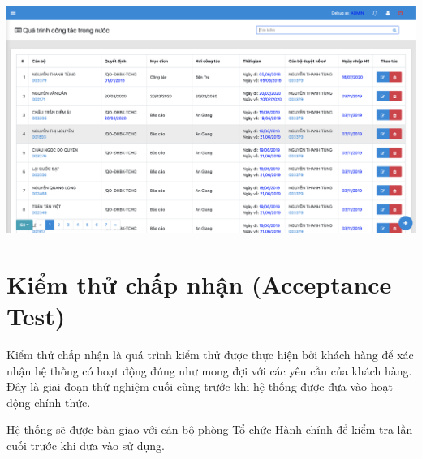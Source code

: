 \begin{center}
  \captionsetup{type=figure}
  \includegraphics[width=15cm]{img/test/viewLast.png}
\end{center}
\section{Kiểm thử chấp nhận (Acceptance Test)}
Kiểm thử chấp nhận là quá trình kiểm thử được thực hiện bởi khách hàng để xác nhận hệ thống có hoạt động đúng như mong đợi với các yêu cầu của khách hàng. Đây là giai đoạn thử nghiệm cuối cùng trước khi hệ thống được đưa vào hoạt động chính thức. 

Hệ thống sẽ được bàn giao với cán bộ phòng Tổ chức-Hành chính để kiểm tra lần cuối trước khi đưa vào sử dụng.